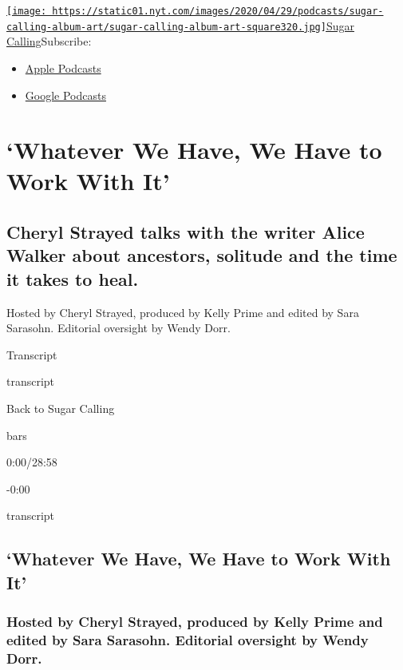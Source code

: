 \href{https://www.nytimes.com/column/sugar-calling}{\texttt{[image: https://static01.nyt.com/images/2020/04/29/podcasts/sugar-calling-album-art/sugar-calling-album-art-square320.jpg]}Sugar
Calling}Subscribe:

\begin{itemize}
\tightlist
\item
  \href{https://itunes.apple.com/us/podcast/id1505881384}{Apple
  Podcasts}
\item
  \href{https://podcasts.google.com/?feed=aHR0cHM6Ly9yc3MuYXJ0MTkuY29tL3N1Z2FyLWNhbGxpbmc\&ved=0CAUQrrcFahcKEwjA8Kyn09voAhUAAAAAHQAAAAAQBQ}{Google
  Podcasts}
\end{itemize}

\hypertarget{whatever-we-have-we-have-to-work-with-it-1}{%
\section{`Whatever We Have, We Have to Work With
It'}\label{whatever-we-have-we-have-to-work-with-it-1}}

\hypertarget{cheryl-strayed-talks-with-the-writer-alice-walker-about-ancestors-solitude-and-the-time-it-takes-to-heal-1}{%
\subsection{Cheryl Strayed talks with the writer Alice Walker about
ancestors, solitude and the time it takes to
heal.}\label{cheryl-strayed-talks-with-the-writer-alice-walker-about-ancestors-solitude-and-the-time-it-takes-to-heal-1}}

Hosted by Cheryl Strayed, produced by Kelly Prime and edited by Sara
Sarasohn. Editorial oversight by Wendy Dorr.

Transcript

transcript

Back to Sugar Calling

bars

0:00/28:58

-0:00

transcript

\hypertarget{whatever-we-have-we-have-to-work-with-it-2}{%
\subsection{`Whatever We Have, We Have to Work With
It'}\label{whatever-we-have-we-have-to-work-with-it-2}}

\hypertarget{hosted-by-cheryl-strayed-produced-by-kelly-prime-and-edited-by-sara-sarasohn-editorial-oversight-by-wendy-dorr-1}{%
\subsubsection{Hosted by Cheryl Strayed, produced by Kelly Prime and
edited by Sara Sarasohn. Editorial oversight by Wendy
Dorr.}\label{hosted-by-cheryl-strayed-produced-by-kelly-prime-and-edited-by-sara-sarasohn-editorial-oversight-by-wendy-dorr-1}}

